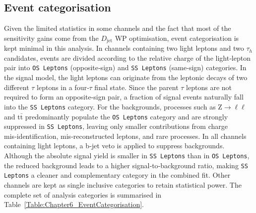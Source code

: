 \subsection{Event categorisation}
Given the limited statistics in some channels and the fact that most of the sensitivity gains come from the $D_\text{jet}$ \ac{WP} optimisation, event categorisation is kept minimal in this analysis. In channels containing two light leptons and two $\tau_h$ candidates, events are divided according to the relative charge of the light‑lepton pair into \texttt{OS Leptons} (opposite‑sign) and \texttt{SS Leptons} (same‑sign) categories. In the signal model, the light leptons can originate from the leptonic decays of two different $\tau$ leptons in a four‑$\tau$ final state. Since the parent $\tau$ leptons are not required to form an opposite‑sign pair, a fraction of signal events naturally fall into the \texttt{SS Leptons} category. For the backgrounds, processes such as $\mathrm{Z\to\ell\ell}$ and $\mathrm{t\bar{t}}$ predominantly populate the \texttt{OS Leptons} category and are strongly suppressed in \texttt{SS Leptons}, leaving only smaller contributions from charge mis‑identification, mis‑reconstructed leptons, and rare processes. In all channels containing light leptons, a b‑jet veto is applied to suppress backgrounds. Although the absolute signal yield is smaller in \texttt{SS Leptons} than in \texttt{OS Leptons}, the reduced background leads to a higher signal‑to‑background ratio, making \texttt{SS Leptons} a cleaner and complementary category in the combined fit. Other channels are kept as single inclusive categories to retain statistical power. The complete set of analysis categories is summarised in Table~\ref{Table:Chapter6_EventCategorisation}.

